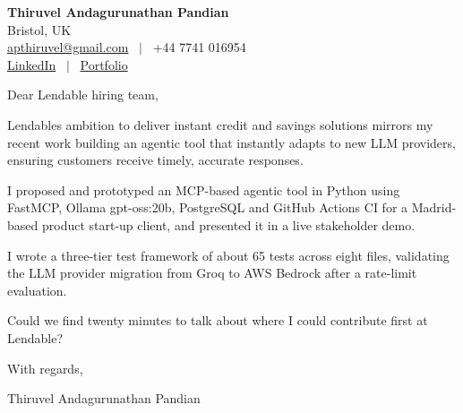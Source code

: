 \documentclass[11pt,a4paper]{article}
\begin{document}
\raggedright
\pagestyle{empty}

\begin{center}
    {\LARGE \color{linkblue} \textbf{Thiruvel Andagurunathan Pandian}}\\[0.2cm]
    Bristol, UK \\
    \href{mailto:apthiruvel@gmail.com}{apthiruvel@gmail.com} \ $|$ \ +44 7741 016954 \\
\href{https://www.linkedin.com/in/thiruvel-a-p/}{LinkedIn} \ $|$ \ \href{https://thiruvel-ap.github.io/PersonalPortfolio/}{Portfolio}
\end{center}

\vspace{0.4cm}

\noindent
Dear Lendable hiring team,

Lendable\textquotesingle{}s ambition to deliver instant credit and savings solutions mirrors my recent work building an agentic tool that instantly adapts to new LLM providers, ensuring customers receive timely, accurate responses.

I proposed and prototyped an MCP-based agentic tool in Python using FastMCP, Ollama gpt-oss:20b, PostgreSQL and GitHub Actions CI for a Madrid-based product start-up client, and presented it in a live stakeholder demo.

I wrote a three-tier test framework of about 65 tests across eight files, validating the LLM provider migration from Groq to AWS Bedrock after a rate-limit evaluation.

Could we find twenty minutes to talk about where I could contribute first at Lendable?

\vspace{0.5cm}

With regards,

Thiruvel Andagurunathan Pandian
\end{document}
